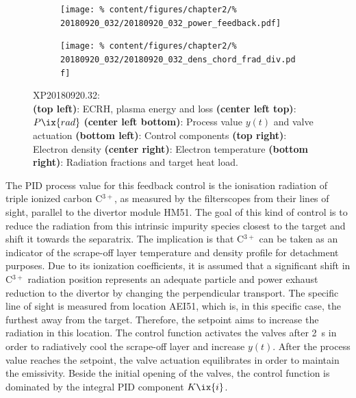                 \begin{figure}[t]%
                    \centering%
                    \begin{subfigure}{.48\textwidth}%
                        \centering%
                        \texttt{[image: \%
                            content/figures/chapter2/\%
                            20180920\_032/20180920\_032\_power\_feedback.pdf]}%
                    \end{subfigure}%
                    \hfill%
                    \begin{subfigure}{.48\textwidth}%
                        \centering%
                        \texttt{[image: \%
                            content/figures/chapter2/\%
                            20180920\_032/20180920\_032\_dens\_chord\_frad\_div.pdf]}%
                    \end{subfigure}%
                    \caption{%
                        XP20180920.32:\\%
                        \textbf{(top left)}: ECRH, plasma energy and loss \textbf{(center left top)}: $P\ix{rad}$ \textbf{(center left bottom)}: Process value $y\left(t\right)$ and valve actuation \textbf{(bottom left)}: Control components \textbf{(top right)}: Electron density \textbf{(center right)}: Electron temperature \textbf{(bottom right)}: Radiation fractions and target heat load.}\label{fig:20180920.32_PDF}%
                \end{figure}%
%
                The PID process value for this feedback control is the ionisation radiation of triple ionized carbon C$^{3+}$, as measured by the filterscopes from their lines of sight, parallel to the divertor module HM51. The goal of this kind of control is to reduce the radiation from this intrinsic impurity species closest to the target and shift it towards the separatrix. The implication is that C$^{3+}$ can be taken as an indicator of the scrape-off layer temperature and density profile for detachment purposes. Due to its ionization coefficients, it is assumed that a significant shift in C$^{3+}$ radiation position represents an adequate particle and power exhaust reduction to the divertor by changing the perpendicular transport. The specific line of sight is measured from location AEI51, which is, in this specific case, the furthest away from the target. Therefore, the setpoint aims to increase the radiation in this location. The control function activates the valves after \SI{2}{\second} in order to radiatively cool the scrape-off layer and increase $y\left(t\right)$. After the process value reaches the setpoint, the valve actuation equilibrates in order to maintain the emissivity. Beside the initial opening of the valves, the control function is dominated by the integral PID component $K\ix{i}$.\\%
